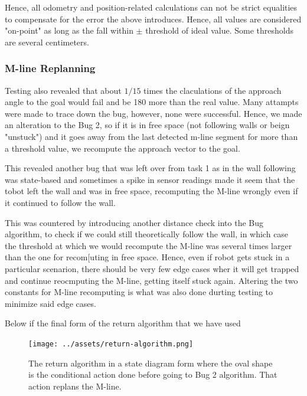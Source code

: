 \documentclass[11pt, a4paper]{article}
\begin{document}
Hence, all odometry and position-related calculations can not be strict equalities to compensate 
for the error the above introduces. Hence, all values are considered "on-point" as long as the 
fall within $\pm$ threshold of ideal value. Some thresholds are several centimeters.



\subsubsection{M-line Replanning}


Testing also revealed that about $1/15$ times the claculations of the approach angle to the goal would 
fail and be 180 \degree more than the real value. Many attampts were made to trace down the bug, however,
none were successful. Hence, we made an alteration to the Bug 2, so if it is in free space (not following 
walls or beign "unstuck"\cite{task1_report}) and it goes away from the last detected m-line segment for more
than a threshold value, we recompute the approach vector to the goal.

This revealed another bug that was left over from task 1 as in the wall following was state-based and sometimes
a spike in sensor readings made it seem that the tobot left the wall and was in free space, recomputing the M-line
wrongly even if it continued to follow the wall. 


This was countered by introducing another distance check into the Bug algorithm, to check if we could still 
theoretically follow the wall, in which case the threshold at which we would recompute the M-line was several 
times larger than the one for recom[uting in free space. Hence, even if robot gets stuck in a particular scenarion, 
there should be very few edge cases wher it will get trapped and continue reocmputing the M-line, getting itself stuck again.
Altering the two constants for M-line recomputing is what was also done durting testing to minimize said edge cases.


Below if the final form of the return algorithm that we have used

\begin{figure}[h]
  \begin{center}
    \texttt{[image: ../assets/return-algorithm.png]}
    \caption{The return algorithm in a state diagram form where the oval shape is the conditional action done before going to Bug 2 algorithm. That action replans the M-line.}
  \end{center}
\end{figure} 
\end{document}
